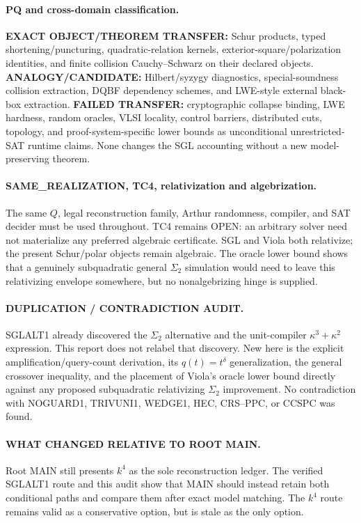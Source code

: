\documentclass[11pt]{article}
\begin{document}
\paragraph{PQ and cross-domain classification.}
\textbf{EXACT OBJECT/THEOREM TRANSFER:} Schur products, typed shortening/puncturing, quadratic-relation kernels, exterior-square/polarization identities, and finite collision Cauchy--Schwarz on their declared objects.
\textbf{ANALOGY/CANDIDATE:} Hilbert/syzygy diagnostics, special-soundness collision extraction, DQBF dependency schemes, and LWE-style external black-box extraction.
\textbf{FAILED TRANSFER:} cryptographic collapse binding, LWE hardness, random oracles, VLSI locality, control barriers, distributed cuts, topology, and proof-system-specific lower bounds as unconditional unrestricted-SAT runtime claims. None changes the SGL accounting without a new model-preserving theorem.

\paragraph{SAME\_REALIZATION, TC4, relativization and algebrization.}
The same $Q$, legal reconstruction family, Arthur randomness, compiler, and SAT decider must be used throughout. TC4 remains OPEN: an arbitrary solver need not materialize any preferred algebraic certificate. SGL and Viola both relativize; the present Schur/polar objects remain algebraic. The oracle lower bound shows that a genuinely subquadratic general $\Sigma_2$ simulation would need to leave this relativizing envelope somewhere, but no nonalgebrizing hinge is supplied.

\paragraph{DUPLICATION / CONTRADICTION AUDIT.}
SGLALT1 already discovered the $\Sigma_2$ alternative and the unit-compiler $\kappa^3+\kappa^2$ expression. This report does not relabel that discovery. New here is the explicit amplification/query-count derivation, its $q(t)=t^\delta$ generalization, the general crossover inequality, and the placement of Viola's oracle lower bound directly against any proposed subquadratic relativizing $\Sigma_2$ improvement. No contradiction with NOGUARD1, TRIVUNI1, WEDGE1, HEC, CRS--PPC, or CCSPC was found.

\paragraph{WHAT CHANGED RELATIVE TO ROOT MAIN.}
Root MAIN still presents $k^4$ as the sole reconstruction ledger. The verified SGLALT1 route and this audit show that MAIN should instead retain both conditional paths and compare them after exact model matching. The $k^4$ route remains valid as a conservative option, but is stale as the only option.
\end{document}
